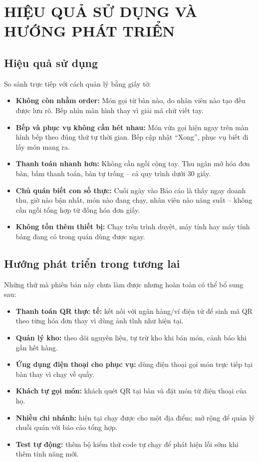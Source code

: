 \documentclass[12pt,a4paper]{report}
\begin{document}
\chapter{HIỆU QUẢ SỬ DỤNG VÀ HƯỚNG PHÁT TRIỂN}

\section{Hiệu quả sử dụng}

So sánh trực tiếp với cách quản lý bằng giấy tờ:

\begin{itemize}
  \item \textbf{Không còn nhầm order:} Món gọi từ bàn nào, do nhân viên nào tạo đều được lưu rõ. Bếp nhìn màn hình thay vì giải mã chữ viết tay.
  \item \textbf{Bếp và phục vụ không cần hét nhau:} Món vừa gọi hiện ngay trên màn hình bếp theo đúng thứ tự thời gian. Bếp cập nhật ``Xong'', phục vụ biết đi lấy món mang ra.
  \item \textbf{Thanh toán nhanh hơn:} Không cần ngồi cộng tay. Thu ngân mở hóa đơn bàn, bấm thanh toán, bàn tự trống -- cả quy trình dưới 30 giây.
  \item \textbf{Chủ quán biết con số thực:} Cuối ngày vào Báo cáo là thấy ngay doanh thu, giờ nào bận nhất, món nào đang chạy, nhân viên nào năng suất -- không cần ngồi tổng hợp từ đống hóa đơn giấy.
  \item \textbf{Không tốn thêm thiết bị:} Chạy trên trình duyệt, máy tính hay máy tính bảng đang có trong quán dùng được ngay.
\end{itemize}

\section{Hướng phát triển trong tương lai}

Những thứ mà phiên bản này chưa làm được nhưng hoàn toàn có thể bổ sung sau:

\begin{itemize}
  \item \textbf{Thanh toán QR thực tế:} kết nối với ngân hàng/ví điện tử để sinh mã QR theo từng hóa đơn thay vì dùng ảnh tĩnh như hiện tại.
  \item \textbf{Quản lý kho:} theo dõi nguyên liệu, tự trừ kho khi bán món, cảnh báo khi gần hết hàng.
  \item \textbf{Ứng dụng điện thoại cho phục vụ:} dùng điện thoại gọi món trực tiếp tại bàn thay vì chạy về quầy.
  \item \textbf{Khách tự gọi món:} khách quét QR tại bàn và đặt món từ điện thoại của họ.
  \item \textbf{Nhiều chi nhánh:} hiện tại chạy được cho một địa điểm; mở rộng để quản lý chuỗi quán với báo cáo tổng hợp.
  \item \textbf{Test tự động:} thêm bộ kiểm thử code tự chạy để phát hiện lỗi sớm khi thêm tính năng mới.
\end{itemize}
\end{document}
